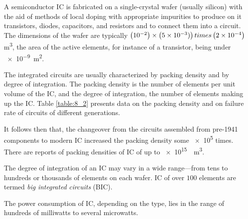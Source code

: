 A semiconductor IC is fabricated on a single-crystal wafer (usually silicon) with the aid of methods of local doping with appropriate impurities to produce on it transistors, diodes, capacitors, and resistors and to connect them into a circuit. The dimensions of the wafer are typically $\left(\num{e-2}\right)\times\left(\num{5e-3})\right)times\left(\num{2e-4}\right)$ \si{\metre\cubed}, the area of the active elements, for instance of a transistor, being under \SI{e-9}{\metre\squared}.

The integrated circuits are usually characterized by packing density and by degree of integration. The packing density is the number of elements per unit volume of the IC, and the degree of integration, the number of elements making up the IC. Table \ref{table:8_2} presents data on the packing density and on failure rate of circuits of different generations.

\begin{table}[!b]
	\renewcommand{\arraystretch}{1.2}
	\caption{}
	\vspace{-0.6cm}
	\label{table:8_2}
	\begin{center}\end{center}
\end{table}

It follows then that, the changeover from the circuits assembled from pre-1941 components to modern IC increased the packing density some \num{e5} times. There are reports of packing densities of IC of up to \SI{e15}{\per\metre\cubed}.

The degree of integration of an IC may vary in a wide range---from tens to hundreds or thousands of elements on each wafer. IC of over $100$ elements are termed \textit{big integrated circuits} (BIC).

The power consumption of IC, depending on the type, lies in the range of hundreds of milliwatts to several microwatts.

